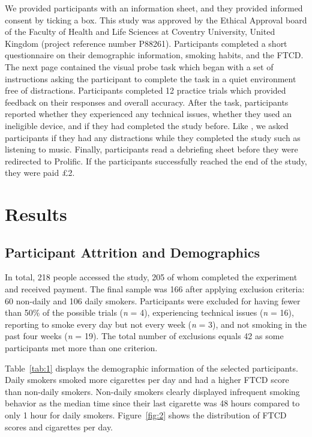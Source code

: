 \documentclass[empirical, authordate, issue]{jote-new-article}
\begin{document}
We provided participants with an information sheet, and they provided informed consent by ticking a box. This study was approved by the Ethical Approval board of the Faculty of Health and Life Sciences at Coventry University, United Kingdom (project reference number P88261). Participants completed a short questionnaire on their demographic information, smoking habits, and the FTCD. The next page contained the visual probe task which began with a set of instructions asking the participant to complete the task in a quiet environment free of distractions. Participants completed 12 practice trials which provided feedback on their responses and overall accuracy. After the task, participants reported whether they experienced any technical issues, whether they used an ineligible device, and if they had completed the study before. Like \textcite{Clifford2014}, we asked participants if they had any distractions while they completed the study such as listening to music. Finally, participants read a debriefing sheet before they were redirected to Prolific. If the participants successfully reached the end of the study, they were paid £2.

\section{Results}

\subsection{Participant Attrition and Demographics}

In total, 218 people accessed the study, 205 of whom completed the experiment and received payment. The final sample was 166 after applying exclusion criteria: 60 non-daily and 106 daily smokers. Participants were excluded for having fewer than 50\% of the possible trials (\emph{n} = 4), experiencing technical issues (\emph{n} = 16), reporting to smoke every day but not every week (\emph{n} = 3), and not smoking in the past four weeks (\emph{n} = 19). The total number of exclusions equals 42 as some participants met more than one criterion.

Table~\ref{tab:1} displays the demographic information of the selected participants. Daily smokers smoked more cigarettes per day and had a higher FTCD score than non-daily smokers. Non-daily smokers clearly displayed infrequent smoking behavior as the median time since their last cigarette was 48 hours compared to only 1 hour for daily smokers. Figure~\ref{fig:2} shows the distribution of FTCD scores and cigarettes per day.
\end{document}
